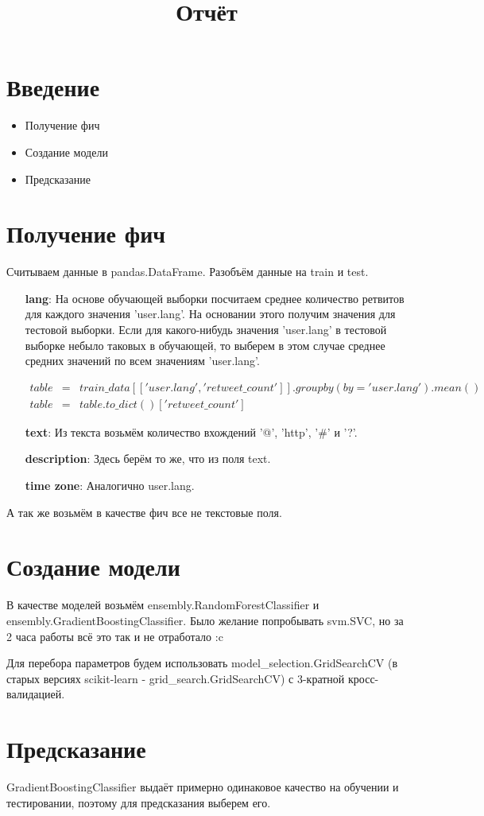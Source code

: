 \documentclass[12pt]{article}
\title{Отчёт}
\date{}
\author{}
\begin{document}
 \section{Введение}
 \begin{itemize}
  \item Получение фич
  \item Создание модели
  \item Предсказание
 \end{itemize}
 \section{Получение фич}
 Считываем данные в pandas.DataFrame. Разобъём данные на train и test. 
 \begin{enumerate}
  \item[\textbf{lang}:] На основе обучающей выборки посчитаем среднее количество ретвитов для каждого значения 'user.lang'. На основании этого
			получим значения для тестовой выборки. Если для какого-нибудь значения 'user.lang' в тестовой выборке небыло таковых в 
			обучающей, то выберем в этом случае среднее средних значений по всем значениям 'user.lang'.
			
			\begin{eqnarray*}
			table &=& train\_data[['user.lang', 'retweet\_count']].groupby(by='user.lang').mean()\\
			table &=& table.to\_dict()['retweet\_count']
			\end{eqnarray*}

  \item[\textbf{text}:] Из текста возьмём количество вхождений '@', 'http', '\#' и '?'.
  \item[\textbf{description}:] Здесь берём то же, что из поля text.
  \item[\textbf{time zone}:] Аналогично user.lang.
 \end{enumerate}
 А так же возьмём в качестве фич все не текстовые поля. 
\section{Создание модели}

 В качестве моделей возьмём ensembly.RandomForestClassifier и ensembly.GradientBoostingClassifier. Было желание попробывать svm.SVC, но за 
 2 часа работы всё это так и не отработало :c
 
 Для перебора параметров будем использовать model\_selection.GridSearchCV (в старых версиях scikit-learn - grid\_search.GridSearchCV) с 
 3-кратной кросс-валидацией.
\section{Предсказание}
 GradientBoostingClassifier выдаёт примерно одинаковое качество на обучении и тестировании, поэтому для предсказания выберем его.
\end{document}
